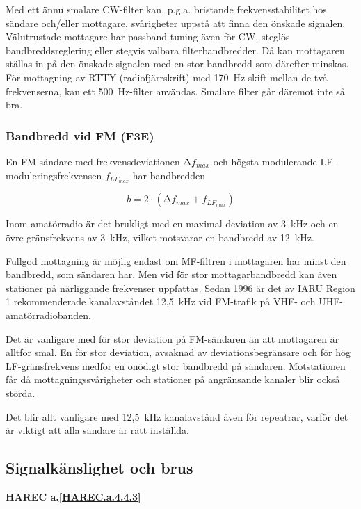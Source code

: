 Med ett ännu smalare CW-filter kan, p.g.a. bristande frekvensstabilitet hos
sändare och/eller mottagare, svårigheter uppstå att finna den önskade signalen.
Välutrustade mottagare har passband-tuning även för CW, steglös
bandbreddsreglering eller stegvis valbara filterbandbredder.
Då kan mottagaren ställas in på den önskade signalen med en stor bandbredd
som därefter minskas.
För mottagning av RTTY (radiofjärrskrift) med 170~Hz skift mellan de två
frekvenserna, kan ett 500~Hz-filter användas.
Smalare filter går däremot inte så bra.

\subsubsection{Bandbredd vid FM (F3E)}

En FM-sändare med frekvensdeviationen \(∆f_{max}\) och högsta
modulerande LF-moduleringsfrekvensen \(f_{LF_{max}}\) har bandbredden

\[ b = 2 \cdot (∆f_{max} + f_{LF_{max}}) \]

Inom amatörradio är det brukligt med en maximal deviation av 3~kHz och
en övre gränsfrekvens av 3~kHz, vilket motsvarar en bandbredd av 12~kHz.

Fullgod mottagning är möjlig endast om MF-filtren i mottagaren har
minst den bandbredd, som sändaren har.
Men vid för stor mottagarbandbredd kan även stationer på närliggande frekvenser
uppfattas.
Sedan 1996 är det av IARU Region 1 rekommenderade kanalavståndet 12,5~kHz
vid FM-trafik på VHF- och UHF-amatörradiobanden.

Det är vanligare med för stor deviation på FM-sändaren än att
mottagaren är alltför smal.
En för stor deviation, avsaknad av deviationsbegränsare och för hög
LF-gränsfrekvens medför en onödigt stor bandbredd på sändaren.
Motstationen får då mottagningssvårigheter och stationer på angränsande
kanaler blir också störda.

Det blir allt vanligare med 12,5~kHz kanalavstånd även för repeatrar,
varför det är viktigt att alla sändare är rätt inställda.

\subsection{Signalkänslighet och brus}
\textbf{HAREC a.\ref{HAREC.a.4.4.3}\label{myHAREC.a.4.4.3}}

